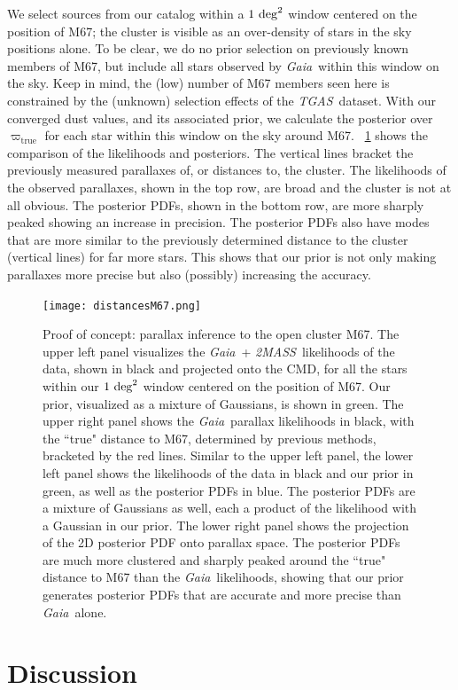 \documentclass[modern]{aastex61}
\newcommand{\acronym}[1]{{\small{#1}}}
\newcommand{\project}[1]{\textsl{#1}}
\newcommand{\tgas}{\project{\acronym{TGAS}}}
\newcommand{\tmass}{\project{\acronym{2MASS}}}
\newcommand{\gaia}{\project{Gaia}}
\newcommand{\cmd}{\acronym{CMD}}
\newcommand{\true}{\mathrm{true}}
\begin{document}
We select sources from our catalog within a $1~{\rm deg}^2$ window centered on the position of M67; the cluster is visible as an over-density of stars in the sky positions alone.
To be clear, we do no prior selection on previously known members of M67, but include all stars observed by \gaia\ within this window on the sky.
Keep in mind, the (low) number of M67 members seen here is constrained by the (unknown) selection effects of the \tgas\ dataset.
With our converged dust values, and its associated prior, we calculate the posterior over $\varpi_{\true}$ for each star within this window on the sky around M67.
\figurename~\ref{fig:m67} shows the comparison of the likelihoods and posteriors.
The vertical lines bracket the previously measured parallaxes of, or distances to, the cluster.
The likelihoods of the observed parallaxes, shown in the top row, are broad and the cluster is not at all obvious.
The posterior PDFs, shown in the bottom row, are more sharply peaked showing an increase in precision.
The posterior PDFs also have modes that are more similar to the previously determined distance to the cluster (vertical lines) for far more stars.
This shows that our prior is not only making parallaxes more precise but also (possibly) increasing the accuracy.
\begin{figure}
\centering
  \texttt{[image: distancesM67.png]}
\caption{Proof of concept: parallax inference to the open cluster M67.
The upper left panel visualizes the \gaia\ + \tmass\ likelihoods of the data, shown in black and projected onto the \cmd, for all the stars within our $1~{\rm deg}^2$ window centered on the position of M67.
Our prior, visualized as a mixture of Gaussians, is shown in green.
The upper right panel shows the \gaia\ parallax likelihoods in black, with the ``true" distance to M67, determined by previous methods, bracketed by the red lines.
Similar to the upper left panel, the lower left panel shows the likelihoods of the data in black and our prior in green, as well as the posterior PDFs in blue.
The posterior PDFs are a mixture of Gaussians as well, each a product of the likelihood with a Gaussian in our prior.
The lower right panel shows the projection of the 2D posterior PDF onto parallax space.
The posterior PDFs are much more clustered and sharply peaked around the ``true" distance to M67 than the \gaia\ likelihoods, showing that our prior generates posterior PDFs that are accurate and more precise than \gaia\ alone.}
\label{fig:m67}
\end{figure}


\section{Discussion}
\end{document}
